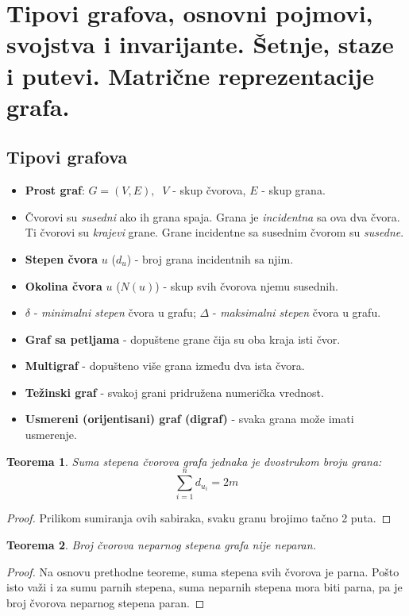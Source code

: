 \documentclass[a4paper,12pt]{article}
\numberwithin{algorithm}{section}
\theoremstyle{plain}
\newtheorem{theorem}{Teorema}[section]
\theoremstyle{definition}
\theoremstyle{remark}
\begin{document}
\section{Tipovi grafova, osnovni pojmovi, svojstva i invarijante. Šetnje, staze i putevi.
Matrične reprezentacije grafa.}
\subsection{Tipovi grafova}
\begin{itemize}
    \item \textbf{Prost graf}: $G = (V, E),\;\; V $ - skup čvorova, $E$ - skup grana.
    \item Čvorovi su \textit{susedni} ako ih grana spaja. Grana je \textit{incidentna} sa ova dva čvora. Ti čvorovi su \textit{krajevi} grane. Grane incidentne sa susednim čvorom su \textit{susedne}.
    \item \textbf{Stepen čvora} $u$ ($d_u$) - broj grana incidentnih sa njim.
    \item \textbf{Okolina čvora} $u$ ($N(u)$) - skup svih čvorova njemu susednih.
    \item \textbf{$\delta$} - \textit{minimalni stepen} čvora u grafu; \textbf{$\Delta$} - \textit{maksimalni stepen} čvora u grafu.
    \item \textbf{Graf sa petljama} - dopuštene grane čija su oba kraja isti čvor.
    \item \textbf{Multigraf} - dopušteno više grana između dva ista čvora.
    \item \textbf{Težinski graf} - svakoj grani pridružena numerička vrednost.
    \item \textbf{Usmereni (orijentisani) graf (digraf)} - svaka grana može imati usmerenje.
\end{itemize}

\begin{theorem}
    Suma stepena čvorova grafa jednaka je dvostrukom broju grana:
    $$\sum_{i = 1}^{n} d_{u_i} = 2m$$
\end{theorem}
\begin{proof}
    Prilikom sumiranja ovih sabiraka, svaku granu brojimo tačno 2 puta.
\end{proof}

\begin{theorem}
    Broj čvorova \textit{neparnog stepena} grafa nije neparan.
\end{theorem}
\begin{proof}
    Na osnovu prethodne teoreme, suma stepena svih čvorova je parna. Pošto isto važi i za sumu parnih stepena, suma neparnih stepena mora biti parna, pa je broj čvorova neparnog stepena paran.
\end{proof}
\end{document}
